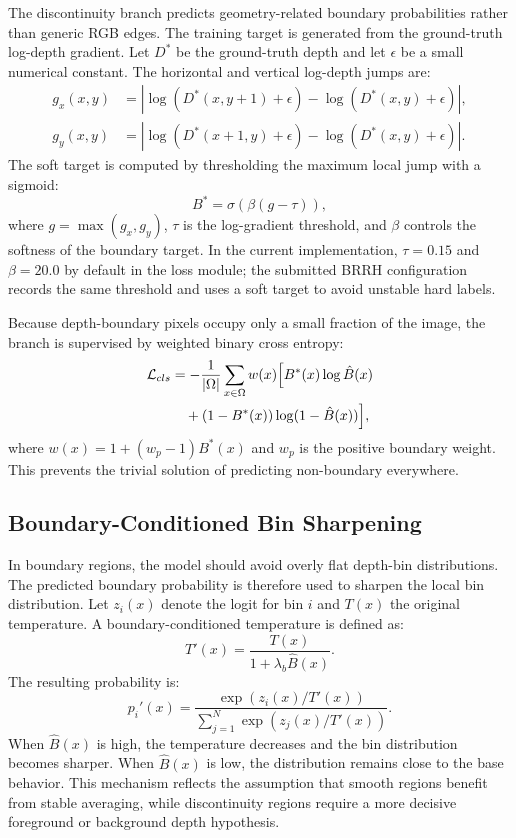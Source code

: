 \documentclass{ieeeaccess}
\begin{document}
The discontinuity branch predicts geometry-related boundary probabilities rather than generic RGB edges. The training target is generated from the ground-truth log-depth gradient. Let $D^*$ be the ground-truth depth and let $\epsilon$ be a small numerical constant. The horizontal and vertical log-depth jumps are:
\begin{align}
g_x(x,y) &= |\log(D^*(x,y+1)+\epsilon)-\log(D^*(x,y)+\epsilon)|,\\
g_y(x,y) &= |\log(D^*(x+1,y)+\epsilon)-\log(D^*(x,y)+\epsilon)|.
\end{align}
The soft target is computed by thresholding the maximum local jump with a sigmoid:
\begin{equation}
B^*=\sigma(\beta(g-\tau)),
\label{eq:boundary_target}
\end{equation}
where $g=\max(g_x,g_y)$, $\tau$ is the log-gradient threshold, and $\beta$ controls the softness of the boundary target. In the current implementation, $\tau=0.15$ and $\beta=20.0$ by default in the loss module; the submitted BRRH configuration records the same threshold and uses a soft target to avoid unstable hard labels.

Because depth-boundary pixels occupy only a small fraction of the image, the branch is supervised by weighted binary cross entropy:
\begin{align}
\mathcal{L}_{cls}
&=-\frac{1}{|\Omega|}
\sum_{x\in\Omega} w(x)\Big[
B^*(x)\log \hat{B}(x) \notag\\
&\quad +(1-B^*(x))\log(1-\hat{B}(x))
\Big],
\end{align}
where $w(x)=1+(w_p-1)B^*(x)$ and $w_p$ is the positive boundary weight. This prevents the trivial solution of predicting non-boundary everywhere.

\subsection{Boundary-Conditioned Bin Sharpening}

In boundary regions, the model should avoid overly flat depth-bin distributions. The predicted boundary probability is therefore used to sharpen the local bin distribution. Let $z_i(x)$ denote the logit for bin $i$ and $T(x)$ the original temperature. A boundary-conditioned temperature is defined as:
\begin{equation}
T'(x)=\frac{T(x)}{1+\lambda_b\hat{B}(x)}.
\label{eq:temperature}
\end{equation}
The resulting probability is:
\begin{equation}
p_i'(x)=
\frac{\exp(z_i(x)/T'(x))}
{\sum_{j=1}^{N}\exp(z_j(x)/T'(x))}.
\end{equation}
When $\hat{B}(x)$ is high, the temperature decreases and the bin distribution becomes sharper. When $\hat{B}(x)$ is low, the distribution remains close to the base behavior. This mechanism reflects the assumption that smooth regions benefit from stable averaging, while discontinuity regions require a more decisive foreground or background depth hypothesis.
\end{document}
